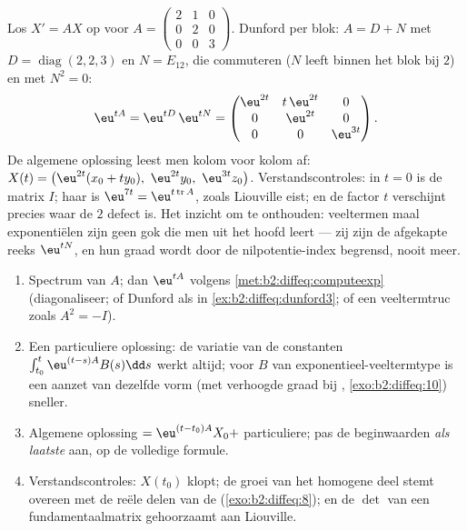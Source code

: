 \begin{example}\label{ex:b2:diffeq:dunford3}
Los $X' = AX$ op voor $A = \begin{pmatrix} 2 & 1 & 0\\ 0 & 2 & 0\\
0 & 0 & 3\end{pmatrix}$. Dunford per blok: $A = D + N$ met $D =
\operatorname{diag}(2, 2, 3)$ en $N = E_{12}$, die commuteren ($N$
leeft binnen het blok bij  $2$) en met $N^2 = 0$:
\[
\eu^{tA} = \eu^{tD}\,\eu^{tN}
= \begin{pmatrix}
\eu^{2t} & t\,\eu^{2t} & 0\\
0 & \eu^{2t} & 0\\
0 & 0 & \eu^{3t}
\end{pmatrix} .
\]
De algemene oplossing leest men kolom voor kolom af: $X(t) =
\bigl(\eu^{2t}(x_0 + ty_0),\ \eu^{2t}y_0,\ \eu^{3t}z_0\bigr)$.
Verstandscontroles: in $t = 0$ is de matrix $I$; haar 
is $\eu^{7t} = \eu^{t\operatorname{tr}A}$, zoals Liouville eist; en
de factor $t$ verschijnt precies waar de  $2$ defect is.
Het inzicht om te onthouden: veeltermen maal exponentiëlen zijn
geen gok die men uit het hoofd leert --- zij zijn de afgekapte
reeks $\eu^{tN}$, en hun graad wordt door de nilpotentie-index
begrensd, nooit meer.
\end{example}

\begin{method}[$X' = AX + B(t)$ oplossen, van begin tot eind]\label{met:b2:diffeq:solvelinear}
\begin{enumerate}
  \item Spectrum van $A$; dan $\eu^{tA}$ volgens
        \cref{met:b2:diffeq:computeexp} (diagonaliseer; of Dunford
        als in \cref{ex:b2:diffeq:dunford3}; of een veeltermtruc
        zoals $A^2 = -I$).
  \item Een particuliere oplossing: de variatie van de constanten
        $\int_{t_0}^t\eu^{(t-s)A}B(s)\dd s$ werkt altijd; voor
        $B$ van exponentieel-veeltermtype is een aanzet van
        dezelfde vorm (met verhoogde graad bij ,
        \cref{exo:b2:diffeq:10}) sneller.
  \item Algemene oplossing $= \eu^{(t-t_0)A}X_0 +$ particuliere;
        pas de beginwaarden \emph{als laatste} aan, op de
        volledige formule.
  \item Verstandscontroles: $X(t_0)$ klopt; de groei van het
        homogene deel stemt overeen met de reële delen van de
         (\cref{exo:b2:diffeq:8}); en de $\det$ van
        een fundamentaalmatrix gehoorzaamt aan Liouville.
\end{enumerate}
\end{method}

